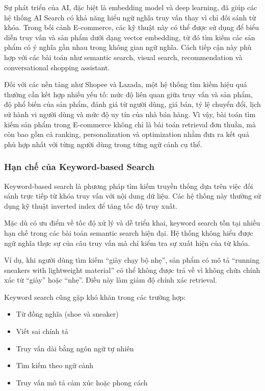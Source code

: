 Sự phát triển của AI, đặc biệt là embedding model và deep learning, đã giúp các hệ thống AI Search có khả năng hiểu ngữ nghĩa truy vấn thay vì chỉ đối sánh từ khóa. Trong bối cảnh E-commerce, các kỹ thuật này có thể được sử dụng để biểu diễn truy vấn và sản phẩm dưới dạng vector embedding, từ đó tìm kiếm các sản phẩm có ý nghĩa gần nhau trong không gian ngữ nghĩa. Cách tiếp cận này phù hợp với các bài toán như semantic search, visual search, recommendation và conversational shopping assistant.

Đối với các nền tảng như Shopee và Lazada, một hệ thống tìm kiếm hiệu quả thường cần kết hợp nhiều yếu tố: mức độ liên quan giữa truy vấn và sản phẩm, độ phổ biến của sản phẩm, đánh giá từ người dùng, giá bán, tỷ lệ chuyển đổi, lịch sử hành vi người dùng và mức độ uy tín của nhà bán hàng. Vì vậy, bài toán tìm kiếm sản phẩm trong E-commerce không chỉ là bài toán retrieval đơn thuần, mà còn bao gồm cả ranking, personalization và optimization nhằm đưa ra kết quả phù hợp nhất với từng người dùng trong từng ngữ cảnh cụ thể.
\subsubsection{Hạn chế của Keyword-based Search}

Keyword-based search là phương pháp tìm kiếm truyền thống dựa trên việc đối sánh trực tiếp từ khóa truy vấn với nội dung dữ liệu. Các hệ thống này thường sử dụng kỹ thuật inverted index để tăng tốc độ truy xuất.

Mặc dù có ưu điểm về tốc độ xử lý và dễ triển khai, keyword search tồn tại nhiều hạn chế trong các bài toán semantic search hiện đại. Hệ thống không hiểu được ngữ nghĩa thực sự của câu truy vấn mà chỉ kiểm tra sự xuất hiện của từ khóa.

Ví dụ, khi người dùng tìm kiếm “giày chạy bộ nhẹ”, sản phẩm có mô tả “running sneakers with lightweight material” có thể không được trả về vì không chứa chính xác từ “giày” hoặc “nhẹ”. Điều này làm giảm độ chính xác retrieval.

Keyword search cũng gặp khó khăn trong các trường hợp:
\begin{itemize}
    \item Từ đồng nghĩa (shoe và sneaker)
    \item Viết sai chính tả
    \item Truy vấn dài bằng ngôn ngữ tự nhiên
    \item Tìm kiếm theo ngữ cảnh
    \item Truy vấn mô tả cảm xúc hoặc phong cách
\end{itemize}

